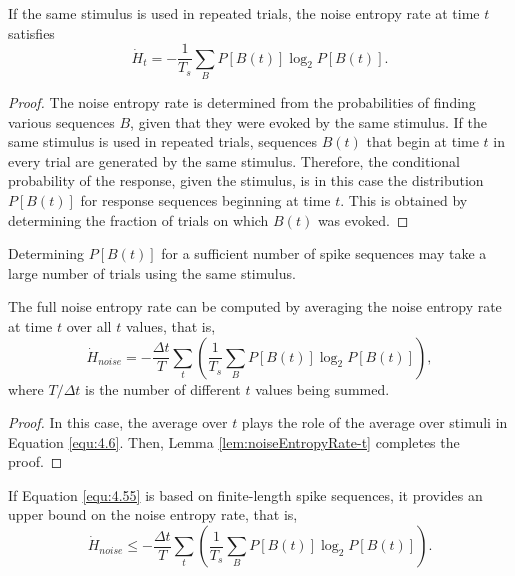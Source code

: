 \begin{lem}
  \label{lem:noiseEntropyRate-t}
  If the same stimulus is used in repeated trials, the noise entropy rate at time $t$ satisfies
  \begin{displaymath}
    \dot{H}_{t} = -\frac{1}{T_{s}}\sum\limits_{B}P[B(t)]\log_{2}P[B(t)].
  \end{displaymath}
\end{lem}
\begin{proof}
  The noise entropy rate is determined from the probabilities of finding various sequences $B$, given that they were evoked by the same stimulus. %
  If the same stimulus is used in repeated trials, sequences $B(t)$ that begin at time $t$ in every trial are generated by the same stimulus. Therefore, the conditional probability of the response, given the stimulus, is in this case the distribution $P[B(t)]$ for response sequences beginning at time $t$. This is obtained by determining the fraction of trials on which $B(t)$ was evoked.
\end{proof}

\begin{rem}
  Determining $P[B(t)]$ for a sufficient number of spike sequences may take a large number of trials using the same stimulus.
\end{rem}

\begin{prop}
  \label{prop:fullNoiseEntropyRate}
  The full noise entropy rate can be computed by averaging the noise entropy rate at time $t$ over all $t$ values, that is,
  \begin{equation}
    \label{equ:4.55}
    \dot{H}_{noise} = -\frac{\Delta t}{T}\sum\limits_{t}\left(\frac{1}{T_{s}}\sum\limits_{B}P[B(t)]\log_{2}P[B(t)]\right),
  \end{equation}
  where $T/\Delta t$ is the number of different $t$ values being summed.
\end{prop}
\begin{proof}
  In this case, the average over $t$ plays the role of the average over stimuli in Equation \ref{equ:4.6}. Then, Lemma \ref{lem:noiseEntropyRate-t} completes the proof.
\end{proof}

\begin{thm}
  If Equation \ref{equ:4.55} is based on finite-length spike sequences, it provides an upper bound on the noise entropy rate, that is,
  \begin{equation}
    \label{equ:upper2}
    \dot{H}_{noise} \leq -\frac{\Delta t}{T}\sum\limits_{t}\left(\frac{1}{T_{s}}\sum\limits_{B}P[B(t)]\log_{2}P[B(t)]\right).
  \end{equation}
\end{thm}

